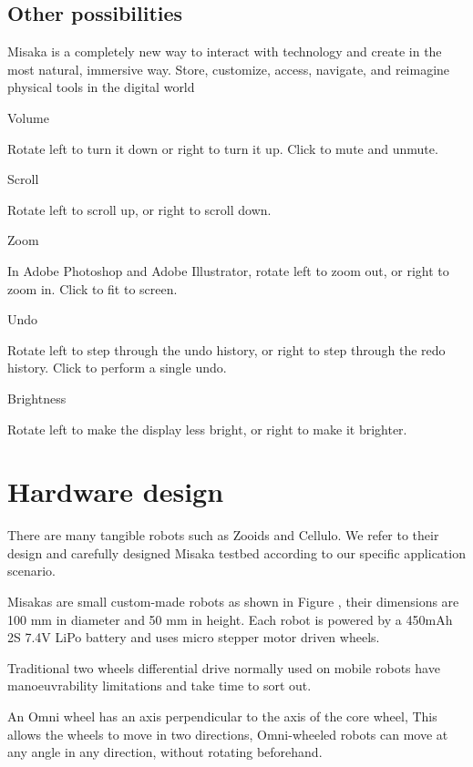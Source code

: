 \documentclass[conference]{IEEEtran}
\begin{document}
\subsection{Other possibilities}


Misaka is a completely new way to interact with technology and create in the most natural, immersive way. Store, customize, access, navigate, and reimagine physical tools in the digital world

Volume

Rotate left to turn it down or right to turn it up. Click to mute and unmute.

Scroll

Rotate left to scroll up, or right to scroll down.

Zoom

In Adobe Photoshop and Adobe Illustrator, rotate left to zoom out, or right to zoom in. Click to fit to screen.

Undo

Rotate left to step through the undo history, or right to step through the redo history. Click to perform a single undo.

Brightness

Rotate left to make the display less bright, or right to make it brighter.




\section{Hardware design}

There are many tangible robots such as Zooids\cite{le2016zooids} and Cellulo\cite{ozgur2017cellulo}. We refer to their design and carefully designed Misaka testbed according to our specific application scenario.


Misakas are small custom-made robots as shown in Figure , their dimensions are 100 mm in diameter and 50 mm in height. Each robot is powered by a 450mAh 2S 7.4V LiPo battery and uses micro stepper motor driven wheels.

Traditional two wheels differential drive normally used on mobile robots have manoeuvrability limitations and take time to sort out\cite{ribeiro2004three}. 

An Omni wheel has an axis perpendicular to the axis of the core wheel, This allows the wheels to move in two directions, Omni-wheeled robots can move at any angle in any direction, without rotating beforehand.
\end{document}
